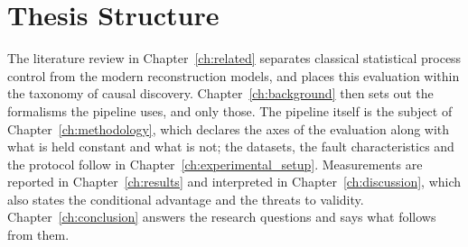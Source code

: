 \section{Thesis Structure}
\label{sec:structure}

The literature review in Chapter~\ref{ch:related} separates classical statistical process control from the modern reconstruction models, and places this evaluation within the taxonomy of causal discovery. Chapter~\ref{ch:background} then sets out the formalisms the pipeline uses, and only those. The pipeline itself is the subject of Chapter~\ref{ch:methodology}, which declares the axes of the evaluation along with what is held constant and what is not; the datasets, the fault characteristics and the protocol follow in Chapter~\ref{ch:experimental_setup}. Measurements are reported in Chapter~\ref{ch:results} and interpreted in Chapter~\ref{ch:discussion}, which also states the conditional advantage and the threats to validity. Chapter~\ref{ch:conclusion} answers the research questions and says what follows from them.
